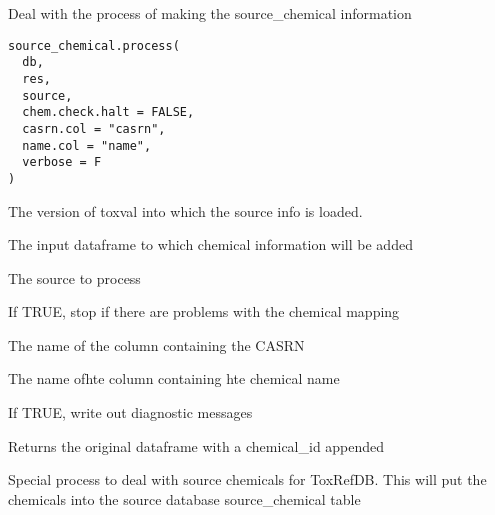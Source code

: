 \documentclass[letterpaper]{book}
\begin{document}
%
\begin{Description}\relax
Deal with the process of making the source\_chemical information
\end{Description}
%
\begin{Usage}
\begin{verbatim}
source_chemical.process(
  db,
  res,
  source,
  chem.check.halt = FALSE,
  casrn.col = "casrn",
  name.col = "name",
  verbose = F
)
\end{verbatim}
\end{Usage}
%
\begin{Arguments}
\begin{ldescription}
\item[\code{db}] The version of toxval into which the source info is loaded.

\item[\code{res}] The input dataframe to which chemical information will be added

\item[\code{source}] The source to process

\item[\code{chem.check.halt}] If TRUE, stop if there are problems with the chemical mapping

\item[\code{casrn.col}] The name of the column containing the CASRN

\item[\code{name.col}] The name ofhte column containing hte chemical name

\item[\code{verbose}] If TRUE, write out diagnostic messages
\end{ldescription}
\end{Arguments}
%
\begin{Value}
Returns the original dataframe with a chemical\_id appended
\end{Value}
%
\begin{Description}\relax
Special process to deal with source chemicals for ToxRefDB. This will put the
chemicals into the source database source\_chemical table
\end{Description}
\end{document}
